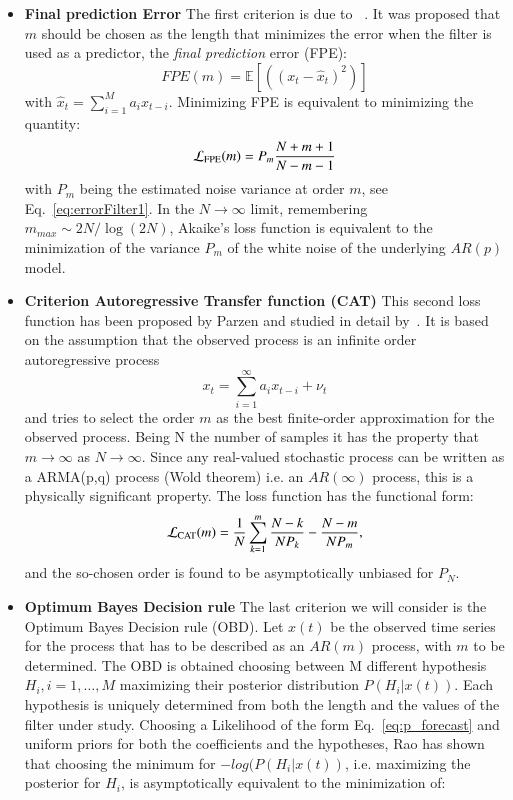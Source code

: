 \documentclass{aa}
\begin{document}
\begin{itemize}
\item \textbf{Final prediction Error} 
The first criterion is due to ~\citet{Akaike1970StatisticalPI}. It was proposed that $m$ should be chosen as the 
length that minimizes the error when the filter is used as a predictor, the \emph{final prediction} error (FPE): 
\begin{equation}
    FPE(m) = \mathbb{E}\left[ \left((x_t - \hat x_t) ^ 2\right) \right]
\end{equation}
with $\hat{x}_t = \sum_{i = 1}^M a_i x_{t - i}$.
Minimizing FPE is equivalent to minimizing the quantity: 
\begin{equation}
    \mathcal{L}_{\rm FPE}(m) = P_{m} \frac{N + m + 1}{N - m - 1}
\end{equation}
with $P_m$ being the estimated noise variance at order $m$, see Eq.~\eqref{eq:errorFilter1}. In the $N \to \infty$ limit, 
remembering $m_{max} \sim 2N / \log(2N)$, Akaike's loss function is equivalent to the minimization of the variance $P_m$ of the white noise of the underlying $AR(p)$ model. 

\item \textbf{Criterion Autoregressive Transfer function (CAT)}
This second loss function has been proposed by Parzen and studied in detail by~\citet{bhansali1986}. 
It is based on the assumption that the observed process is an infinite order autoregressive process 
\begin{equation} 
x_t = \sum_{i = 1}^{\infty}a_{i}x_{t-i} + \nu_t
\end{equation} 
and tries to select the order $m$ as the best finite-order approximation for the observed process. Being N the number of samples it has the property that $m \to \infty$ as $N \to \infty$. Since any real-valued stochastic process can be written as a ARMA(p,q) process (Wold theorem) i.e. an $AR(\infty)$ process, this is a physically significant property. 
The loss function has the functional form: 
\begin{equation}
    \mathcal{L}_{\rm CAT}(m) = \frac{1}{N}\sum_{k = 1}^m \frac{N - k}{N P_k} - \frac{N - m}{N P_m},
\end{equation}
and the so-chosen order is found to be asymptotically unbiased for $P_N$. 

\item \textbf{Optimum Bayes Decision rule} 
The last criterion we will consider is the Optimum Bayes Decision rule (OBD)\citep{doi:10.1029/WR018i004p01097}. Let $x(t)$ be the observed 
time series for the process that has to be described as an $AR(m)$ process, with $m$ to be determined. The OBD is obtained choosing between M different hypothesis $H_i, i = 1, \dots, M$ maximizing their posterior distribution $P(H_i\vert x(t))$. Each
hypothesis is uniquely determined from both the length and the values of the filter under study. Choosing a Likelihood of the form Eq.~\eqref{eq:p_forecast} and uniform priors for both the coefficients and the hypotheses, Rao has shown that choosing the minimum for $-log(P(H_i \vert x(t))$, i.e. maximizing the posterior for $H_i$, is asymptotically equivalent to the minimization of:


\end{itemize}
\end{document}
